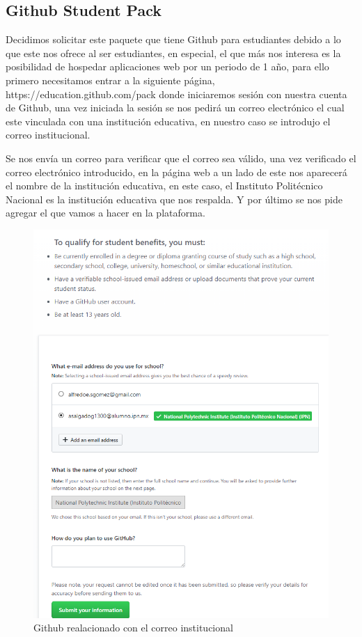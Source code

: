 \documentclass[12pt, a4paper, titlepage]{report}
\begin{document}
		\subsection{Github Student Pack}
		Decidimos solicitar este paquete que tiene Github para estudiantes debido a lo que este nos ofrece al ser estudiantes, en especial, el que más nos interesa es la posibilidad de hospedar aplicaciones web por un periodo de 1 año, para ello primero necesitamos entrar a la siguiente página, https://education.github.com/pack donde iniciaremos sesión con nuestra cuenta de Github, una vez iniciada la sesión se nos pedirá un correo electrónico el cual este vinculada con una institución educativa, en nuestro caso se introdujo el correo institucional.\par
		Se nos envía un correo para verificar que el correo sea válido, una vez verificado el correo electrónico introducido, en la página web a un lado de este nos aparecerá el nombre de la institución educativa, en este caso, el Instituto Politécnico Nacional es la institución educativa que nos respalda. Y por último se nos pide agregar el que vamos a hacer en la plataforma.\par
		\begin{figure}[H]
			\includegraphics[width=12cm]{./imagenes/MarcoTeorico/GitHub/GitS1.png}
			\centering 
			\caption{Github realacionado con el correo institucional}
		\end{figure}
\end{document}
